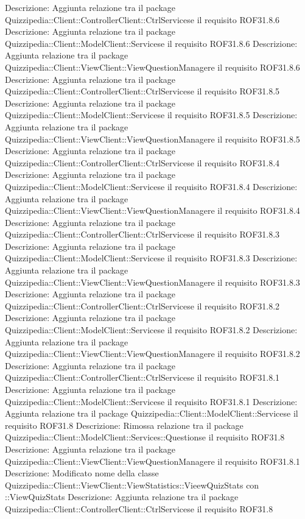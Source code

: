Descrizione: Aggiunta relazione tra il package Quizzipedia::Client::ControllerClient::CtrlServicese il requisito ROF31.8.6 
Descrizione: Aggiunta relazione tra il package Quizzipedia::Client::ModelClient::Servicese il requisito ROF31.8.6 
Descrizione: Aggiunta relazione tra il package Quizzipedia::Client::ViewClient::ViewQuestionManagere il requisito ROF31.8.6 
Descrizione: Aggiunta relazione tra il package Quizzipedia::Client::ControllerClient::CtrlServicese il requisito ROF31.8.5 
Descrizione: Aggiunta relazione tra il package Quizzipedia::Client::ModelClient::Servicese il requisito ROF31.8.5 
Descrizione: Aggiunta relazione tra il package Quizzipedia::Client::ViewClient::ViewQuestionManagere il requisito ROF31.8.5 
Descrizione: Aggiunta relazione tra il package Quizzipedia::Client::ControllerClient::CtrlServicese il requisito ROF31.8.4 
Descrizione: Aggiunta relazione tra il package Quizzipedia::Client::ModelClient::Servicese il requisito ROF31.8.4 
Descrizione: Aggiunta relazione tra il package Quizzipedia::Client::ViewClient::ViewQuestionManagere il requisito ROF31.8.4 
Descrizione: Aggiunta relazione tra il package Quizzipedia::Client::ControllerClient::CtrlServicese il requisito ROF31.8.3 
Descrizione: Aggiunta relazione tra il package Quizzipedia::Client::ModelClient::Servicese il requisito ROF31.8.3 
Descrizione: Aggiunta relazione tra il package Quizzipedia::Client::ViewClient::ViewQuestionManagere il requisito ROF31.8.3 
Descrizione: Aggiunta relazione tra il package Quizzipedia::Client::ControllerClient::CtrlServicese il requisito ROF31.8.2 
Descrizione: Aggiunta relazione tra il package Quizzipedia::Client::ModelClient::Servicese il requisito ROF31.8.2 
Descrizione: Aggiunta relazione tra il package Quizzipedia::Client::ViewClient::ViewQuestionManagere il requisito ROF31.8.2 
Descrizione: Aggiunta relazione tra il package Quizzipedia::Client::ControllerClient::CtrlServicese il requisito ROF31.8.1 
Descrizione: Aggiunta relazione tra il package Quizzipedia::Client::ModelClient::Servicese il requisito ROF31.8.1 
Descrizione: Aggiunta relazione tra il package Quizzipedia::Client::ModelClient::Servicese il requisito ROF31.8 
Descrizione: Rimossa relazione tra il package Quizzipedia::Client::ModelClient::Services::Questionse il requisito ROF31.8 
Descrizione: Aggiunta relazione tra il package Quizzipedia::Client::ViewClient::ViewQuestionManagere il requisito ROF31.8.1 
Descrizione: Modificato nome della classe Quizzipedia::Client::ViewClient::ViewStatistics::VieewQuizStats con ::ViewQuizStats 
Descrizione: Aggiunta relazione tra il package Quizzipedia::Client::ControllerClient::CtrlServicese il requisito ROF31.8 
